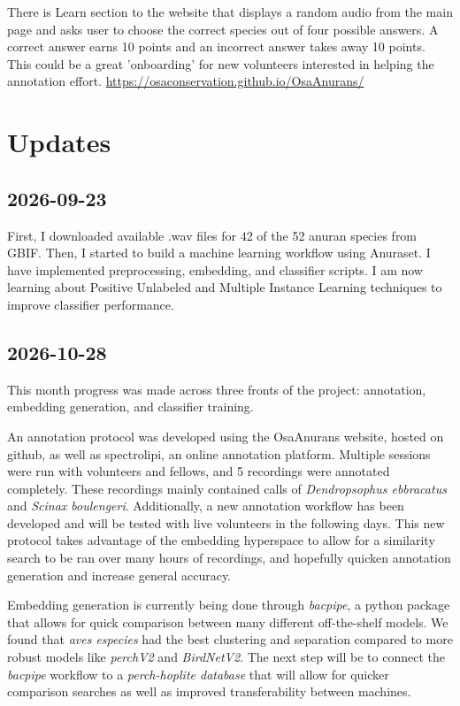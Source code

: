 \documentclass{article}
\begin{document}
There is Learn section to the website that displays a random audio from the main page and asks user to choose the correct species out of four possible answers. A correct answer earns 10 points and an incorrect answer takes away 10 points. This could be a great 'onboarding' for new volunteers interested in helping the annotation effort. 
\url{https://osaconservation.github.io/OsaAnurans/}

\section{Updates}
\subsection{2026-09-23}
First, I downloaded available .wav files for 42 of the 52 anuran species from GBIF.
Then, I started to build a machine learning workflow using Anuraset. I have implemented preprocessing, embedding, and classifier scripts. I am now learning about Positive Unlabeled and Multiple Instance Learning techniques to improve classifier performance.

\subsection{2026-10-28}
This month progress was made across three fronts of the project: annotation, embedding generation, and classifier training. 

An annotation protocol was developed using the OsaAnurans website, hosted on github, as well as spectrolipi, an online annotation platform. 
Multiple sessions were run with volunteers and fellows, and 5 recordings were annotated completely. 
These recordings mainly contained calls of \emph{Dendropsophus ebbracatus} and \textit{Scinax boulengeri}. 
Additionally, a new annotation workflow has been developed and will be tested with live volunteers in the following days. 
This new protocol takes advantage of the embedding hyperspace to allow for a similarity search to be ran over many hours of recordings, and hopefully quicken annotation generation and increase general accuracy. 

Embedding generation is currently being done through \textit{bacpipe}, a python package that allows for quick comparison between many different off-the-shelf models. 
We found that \textit{aves especies} had the best clustering and separation compared to more robust models like \textit{perchV2} and \textit{BirdNetV2}. 
The next step will be to connect the \textit{bacpipe} workflow to a \textit{perch-hoplite database} that will allow for quicker comparison searches as well as improved transferability between machines. 
\end{document}

